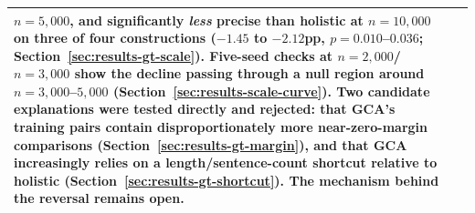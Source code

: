 \begin{table}[htbp]
\begin{tabularx}{\textwidth}{@{}>{\bfseries}l X@{}}
  $n=5{,}000$, and significantly \emph{less} precise than holistic at
  $n=10{,}000$ on three of four constructions ($-1.45$ to $-2.12$pp,
  $p=0.010$--$0.036$; Section~\ref{sec:results-gt-scale}). Five-seed checks at
  $n=2{,}000$/$n=3{,}000$ show the decline passing through a null region
  around $n=3{,}000$--$5{,}000$
  (Section~\ref{sec:results-scale-curve}). Two candidate
  explanations were tested directly and rejected: that GCA's training pairs
  contain disproportionately more near-zero-margin comparisons
  (Section~\ref{sec:results-gt-margin}), and that GCA increasingly relies on
  a length/sentence-count shortcut relative to holistic
  (Section~\ref{sec:results-gt-shortcut}). The mechanism behind the reversal
  remains open. \\
\bottomrule
\end{tabularx}
\end{table}
